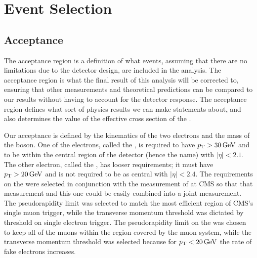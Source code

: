 \chapter{Event Selection}
\label{chapter:event_selection}


\section{Acceptance}
\label{sec:acceptance}


The acceptance region is a definition of what events, assuming that there are
no limitations due to the detector design, are included in the analysis. The
acceptance region is what the final result of this analysis will be corrected
to, ensuring that other measurements and theoretical predictions can be
compared to our results without having to account for the detector response.
The acceptance region defines what sort of physics results we can make
statements about, and also determines the value of the effective cross section
of the \Z.

Our acceptance is defined by the kinematics of the two electrons and the mass
of the \Z boson. One of the electrons, called the \CentralElectron, is required
to have $\pt > \SI{30}{\GeV}$ and to be within the central region of the
detector (hence the name) with $|\eta| < 2.1$. The other electron, called the
\ExtendedElectron, has looser requirements; it must have $\pt > \SI{20}{\GeV}$
and is not required to be as central with $|\eta| < 2.4$. The requirements on
the \CentralElectron were selected in conjunction with the \Ztomumu measurement
of \phistar at CMS so that that measurement and this one could be easily
combined into a joint measurement. The pseudorapidity limit was selected to
match the most efficient region of CMS's single muon trigger, while the
transverse momentum threshold was dictated by threshold on single electron
trigger. The pseudorapidity limit on the \ExtendedElectron was chosen to keep
all of the muons within the region covered by the muon system, while the
transverse momentum threshold was selected because for $\pt < \SI{20}{\GeV}$
the rate of fake electrons increases.

